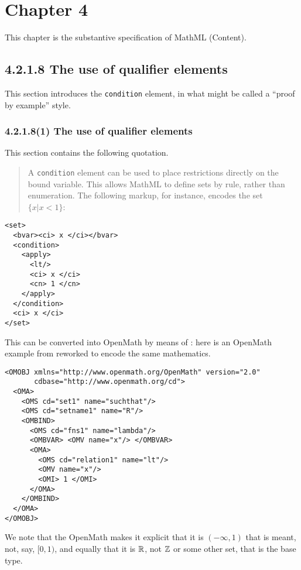\documentclass{llncs}
\begin{document}
{\section{Chapter 4}
This chapter is the substantive specification of MathML (Content).
\subsection{4.2.1.8 The use of qualifier elements}\label{4218}
This section introduces the {\tt condition} element, in what might be called a
``proof by example'' style.
\subsubsection{4.2.1.8(1) The use of qualifier elements}\label{42181}
This section contains the following quotation.
\begin{quotation}\noindent
A {\tt condition} element can be used to place restrictions directly on the
bound variable. This allows MathML to define sets by rule, rather than
enumeration. The following markup, for instance, encodes the set $\{x | x <
1\}$: 
\end{quotation}
\begin{lstlisting}[language=MathML2]
<set>
  <bvar><ci> x </ci></bvar>
  <condition>
    <apply>
      <lt/>
      <ci> x </ci>
      <cn> 1 </cn>
    </apply>
  </condition>
  <ci> x </ci>
</set>
\end{lstlisting}
This can be converted into OpenMath by means of {}: here is an
OpenMath example from {} reworked to encode the same mathematics.
\begin{lstlisting}
<OMOBJ xmlns="http://www.openmath.org/OpenMath" version="2.0"
       cdbase="http://www.openmath.org/cd">
  <OMA>
    <OMS cd="set1" name="suchthat"/>
    <OMS cd="setname1" name="R"/>
    <OMBIND>
      <OMS cd="fns1" name="lambda"/>
      <OMBVAR> <OMV name="x"/> </OMBVAR>
      <OMA>
        <OMS cd="relation1" name="lt"/>
        <OMV name="x"/>
        <OMI> 1 </OMI>
      </OMA>
    </OMBIND>
  </OMA>
</OMOBJ>
\end{lstlisting}
We note that the OpenMath makes it explicit that it is $(-\infty,1)$ that is
meant, not, say, $[0,1)$, and equally that it is $\mathbb{R}$, not $\mathbb{Z}$ or some other
set, that is the base type.
}
\end{document}
